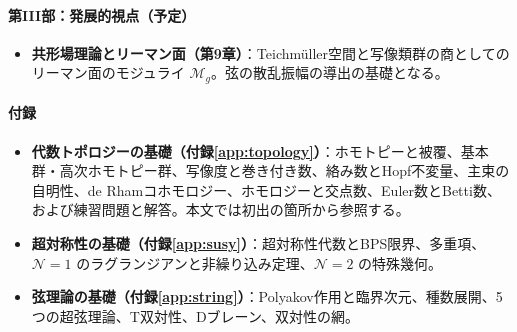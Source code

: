 \documentclass[uplatex, dvipdfmx, book]{jsbook}
\begin{document}
\paragraph{第III部：発展的視点（予定）}
\begin{itemize}
    \item \textbf{共形場理論とリーマン面（第9章）}：Teichm\"uller空間と写像類群の商としてのリーマン面のモジュライ $\mathcal{M}_g$。弦の散乱振幅の導出の基礎となる。
\end{itemize}

\paragraph{付録}
\begin{itemize}
    \item \textbf{代数トポロジーの基礎（付録\ref{app:topology}）}：ホモトピーと被覆、基本群・高次ホモトピー群、写像度と巻き付き数、絡み数とHopf不変量、主束の自明性、de Rhamコホモロジー、ホモロジーと交点数、Euler数とBetti数、および練習問題と解答。本文では初出の箇所から参照する。
    \item \textbf{超対称性の基礎（付録\ref{app:susy}）}：超対称性代数とBPS限界、多重項、$\mathcal{N}=1$ のラグランジアンと非繰り込み定理、$\mathcal{N}=2$ の特殊幾何。
    \item \textbf{弦理論の基礎（付録\ref{app:string}）}：Polyakov作用と臨界次元、種数展開、5つの超弦理論、T双対性、Dブレーン、双対性の網。
\end{itemize}
\end{document}

